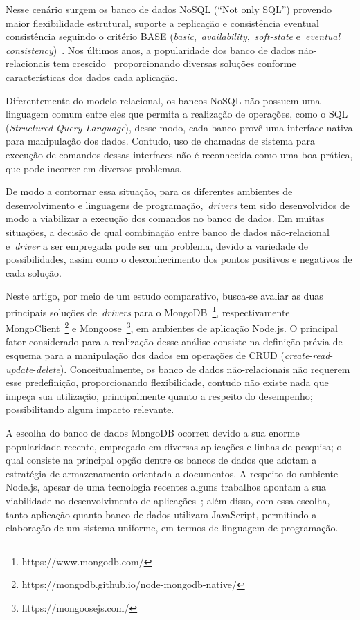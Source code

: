 \documentclass[12pt]{article}
\begin{document}
Nesse cenário surgem os banco de dados NoSQL (``Not only SQL'') provendo maior flexibilidade estrutural, suporte a replicação e consistência eventual consistência seguindo o critério BASE (\textit{basic},~\textit{availability},~\textit{soft-state} e~\textit{eventual consistency})~\cite{han2011survey}. 
Nos últimos anos, a popularidade dos banco de dados não-relacionais tem crescido~\cite{cooper2010benchmarking,edlich2015nosql} proporcionando diversas soluções conforme características dos dados cada aplicação.

Diferentemente do modelo relacional, os bancos NoSQL não possuem uma linguagem comum entre eles que permita a realização de operações, como o SQL (\emph{Structured Query Language}), desse modo, cada banco provê uma interface nativa para manipulação dos dados. 
Contudo, uso de chamadas de sistema para execução de comandos dessas interfaces não é reconhecida como uma boa prática, que pode incorrer em diversos problemas. 

De modo a contornar essa situação, para os diferentes ambientes de desenvolvimento e linguagens de programação,~\emph{drivers} tem sido desenvolvidos de modo a viabilizar a execução dos comandos no banco de dados. 
Em muitas situações, a decisão de qual combinação entre banco de dados não-relacional e~\emph{driver} a ser empregada pode ser um problema, devido a variedade de possibilidades, assim como o desconhecimento dos pontos positivos e negativos de cada solução.

Neste artigo, por meio de um estudo comparativo, busca-se avaliar as duas principais soluções de~\emph{drivers} para o MongoDB~\footnote{https://www.mongodb.com/}, respectivamente MongoClient~\footnote{https://mongodb.github.io/node-mongodb-native/} e Mongoose~\footnote{https://mongoosejs.com/}, em ambientes de aplicação Node.js. 
O principal fator considerado para a realização desse análise consiste na definição prévia de esquema para a manipulação dos dados em operações de CRUD (\emph{create}-\emph{read}-\emph{update}-\emph{delete}). Conceitualmente, os banco de dados não-relacionais não requerem esse predefinição, proporcionando flexibilidade, contudo não existe nada que impeça sua utilização, principalmente quanto a respeito do desempenho; possibilitando algum impacto relevante.

A escolha do banco de dados MongoDB ocorreu devido a sua enorme popularidade recente, empregado em diversas aplicações e linhas de pesquisa; o qual consiste na principal opção dentre os bancos de dados que adotam a estratégia de armazenamento orientada a documentos.
A respeito do ambiente Node.js, apesar de uma tecnologia recentes alguns trabalhos apontam a sua viabilidade no desenvolvimento de aplicações~\cite{chaniotis2015node}; além disso, com essa escolha, tanto aplicação quanto banco de dados utilizam JavaScript, permitindo a elaboração de um sistema uniforme, em termos de linguagem de programação.
\end{document}
